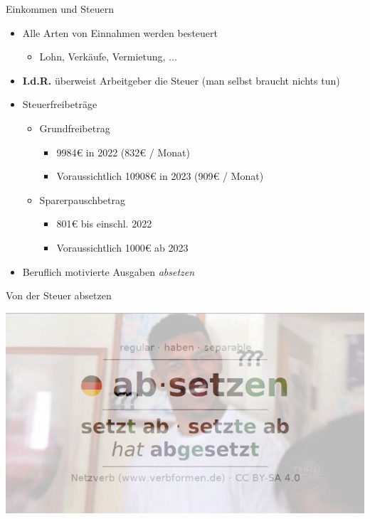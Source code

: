 \documentclass{beamer}
\begin{document}
			\begin{frame}{Einkommen und Steuern}
				\begin{itemize}
					\item Alle Arten von Einnahmen werden besteuert
					\begin{itemize}
						\item Lohn, Verkäufe, Vermietung, ...
					\end{itemize}
					\item \textbf{I.d.R.} überweist Arbeitgeber die Steuer (man selbst braucht nichts tun)
					\item Steuerfreibeträge
					\begin{itemize}
						\item Grundfreibetrag
						\begin{itemize}
							\item 9984€ in 2022 (832€ / Monat)
							\item Voraussichtlich 10908€ in 2023 (909€ / Monat)
						\end{itemize}
						\item Sparerpauschbetrag
						\begin{itemize}
							\item 801€ bis einschl. 2022
							\item Voraussichtlich 1000€ ab 2023
						\end{itemize}
					\end{itemize}
					\item Beruflich motivierte Ausgaben \textit{absetzen}
				\end{itemize}
			\end{frame}
		
			\begin{frame}{Von der Steuer absetzen}
				\begin{center}
					\includegraphics[width=0.75\linewidth]{images/absetzen}
				\end{center}
			\end{frame}
		
\end{document}
